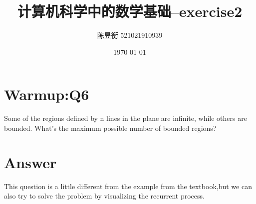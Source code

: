\documentclass[a4paper]{article}
\title{计算机科学中的数学基础--exercise2}
\author{陈昱衡 521021910939}
\date{\today}
\begin{document}
\maketitle


\section*{Warmup:Q6}
Some of the regions defined by n lines in the plane are infinite, while
others are bounded. What's the maximum possible number of bounded
regions?
\par 

\section*{Answer}
This question is a little different from the example from the textbook,but we can also try to solve the problem by visualizing the recurrent process. \par 
\end{document}
